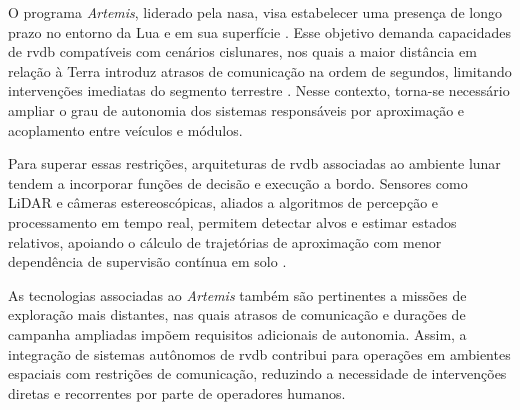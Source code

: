 O programa \emph{Artemis}, liderado pela \gls{nasa}, visa estabelecer uma presença de longo prazo no entorno da Lua e em sua superfície \cite{nasaArtemis}.
Esse objetivo demanda capacidades de \gls{rvdb} compatíveis com cenários cislunares, nos quais a maior distância em relação à Terra introduz atrasos de comunicação na ordem de segundos, limitando intervenções imediatas do segmento terrestre \cite{keeports2006}.
Nesse contexto, torna-se necessário ampliar o grau de autonomia dos sistemas responsáveis por aproximação e acoplamento entre veículos e módulos.

Para superar essas restrições, arquiteturas de \gls{rvdb} associadas ao ambiente lunar tendem a incorporar funções de decisão e execução a bordo.
Sensores como LiDAR \cite{farkasvolgyi2023} e câmeras estereoscópicas, aliados a algoritmos de percepção e processamento em tempo real, permitem detectar alvos e estimar estados relativos, apoiando o cálculo de trajetórias de aproximação com menor dependência de supervisão contínua em solo \cite{ibmComputerVision}.

As tecnologias associadas ao \emph{Artemis} também são pertinentes a missões de exploração mais distantes, nas quais atrasos de comunicação e durações de campanha ampliadas impõem requisitos adicionais de autonomia.
Assim, a integração de sistemas autônomos de \gls{rvdb} contribui para operações em ambientes espaciais com restrições de comunicação, reduzindo a necessidade de intervenções diretas e recorrentes por parte de operadores humanos.
